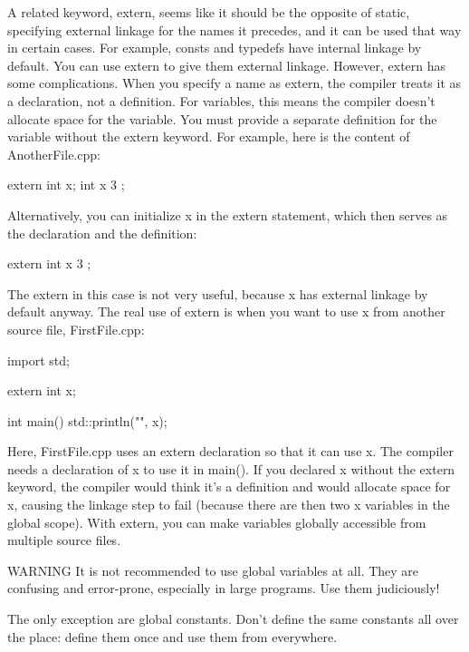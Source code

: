 
A related keyword, extern, seems like it should be the opposite of static, specifying external linkage for the names it precedes, and it can be used that way in certain cases. For example, consts and typedefs have internal linkage by default. You can use extern to give them external linkage. However, extern has some complications. When you specify a name as extern, the compiler treats it as a declaration, not a definition. For variables, this means the compiler doesn’t allocate space for the variable. You must provide a separate definition for the variable without the extern keyword. For example, here is the content of AnotherFile.cpp:

\begin{cpp}
extern int x;
int x { 3 };
\end{cpp}

Alternatively, you can initialize x in the extern statement, which then serves as the declaration and the definition:

\begin{cpp}
extern int x { 3 };
\end{cpp}

The extern in this case is not very useful, because x has external linkage by default anyway. The real use of extern is when you want to use x from another source file, FirstFile.cpp:

\begin{cpp}
import std;

extern int x;

int main()
{
    std::println("{}", x);
}
\end{cpp}

Here, FirstFile.cpp uses an extern declaration so that it can use x. The compiler needs a declaration of x to use it in main(). If you declared x without the extern keyword, the compiler would think it’s a definition and would allocate space for x, causing the linkage step to fail (because there are then two x variables in the global scope). With extern, you can make variables globally accessible from multiple source files.

\begin{myWarning}{WARNING}
It is not recommended to use global variables at all. They are confusing and error-prone, especially in large programs. Use them judiciously!

The only exception are global constants. Don’t define the same constants all over the place: define them once and use them from everywhere.
\end{myWarning}



